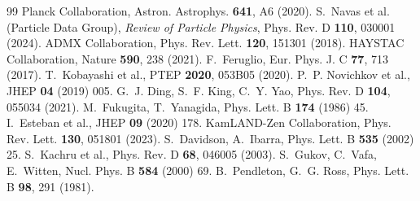 \documentclass[12pt,a4paper]{article}
\numberwithin{equation}{section}
\begin{document}
\begin{thebibliography}{99}
 Planck Collaboration, Astron. Astrophys. \textbf{641}, A6 (2020).
 S.~Navas et al. (Particle Data Group), \emph{Review of Particle Physics}, Phys. Rev. D \textbf{110}, 030001 (2024).
 ADMX Collaboration, Phys. Rev. Lett. \textbf{120}, 151301 (2018).
 HAYSTAC Collaboration, Nature \textbf{590}, 238 (2021).
 F.~Feruglio, Eur. Phys. J. C \textbf{77}, 713 (2017).
 T.~Kobayashi et al., PTEP \textbf{2020}, 053B05 (2020).
 P.~P. Novichkov et al., JHEP \textbf{04} (2019) 005.
 G.~J. Ding, S.~F. King, C.~Y. Yao, Phys. Rev. D \textbf{104}, 055034 (2021).
 M.~Fukugita, T.~Yanagida, Phys. Lett. B \textbf{174} (1986) 45.
 I.~Esteban et al., JHEP \textbf{09} (2020) 178.
 KamLAND-Zen Collaboration, Phys. Rev. Lett. \textbf{130}, 051801 (2023).
 S.~Davidson, A.~Ibarra, Phys. Lett. B \textbf{535} (2002) 25.
 S.~Kachru et al., Phys. Rev. D \textbf{68}, 046005 (2003).
 S.~Gukov, C.~Vafa, E.~Witten, Nucl. Phys. B \textbf{584} (2000) 69.
 B.~Pendleton, G.~G. Ross, Phys. Lett. B \textbf{98}, 291 (1981).
\end{thebibliography}
\end{document}
